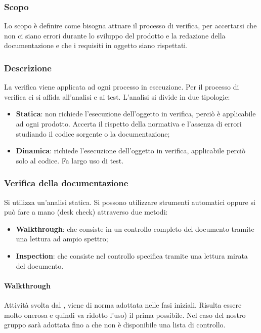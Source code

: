 \subsubsection{Scopo}
Lo scopo è definire come bisogna attuare il processo di verifica, per accertarsi che non ci siano errori durante lo sviluppo del prodotto e la redazione della documentazione e che i requisiti in oggetto siano rispettati. 

\subsubsection{Descrizione}
La verifica viene applicata ad ogni processo in esecuzione. Per il processo di verifica ci si affida all'analisi e ai test. L'analisi si divide in due tipologie:
\begin{itemize}
\item \textbf{Statica}: non richiede l'esecuzione dell'oggetto in verifica, perciò è applicabile ad ogni prodotto. Accerta il rispetto della normativa e l'assenza di errori studiando il codice sorgente o la documentazione;
\item \textbf{Dinamica}: richiede l'esecuzione dell'oggetto in verifica, applicabile perciò solo al codice. Fa largo uso di test.
\end{itemize}

\subsubsection{Verifica della documentazione}
Si utilizza un'analisi statica. Si possono utilizzare strumenti automatici oppure si può fare a mano (desk check) attraverso due metodi:
\begin{itemize}
\item \textbf{Walkthrough}: che consiste in un controllo completo del documento tramite una lettura ad ampio spettro;
\item \textbf{Inspection}: che consiste nel controllo specifica tramite una lettura mirata del documento.
\end{itemize}

\paragraph{Walkthrough}
Attività svolta dal \VE, viene di norma adottata nelle fasi iniziali. Risulta essere molto onerosa e quindi va ridotto l'uso) il prima possibile. Nel caso del nostro gruppo sarà adottata fino a che non è disponibile una lista di controllo.

